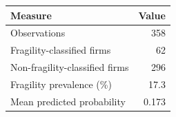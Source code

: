 \begin{tabular}{lr}
\toprule
Measure & Value \\
\midrule
Observations & 358 \\
Fragility-classified firms & 62 \\
Non-fragility-classified firms & 296 \\
Fragility prevalence (\%) & 17.3 \\
Mean predicted probability & 0.173 \\
\bottomrule
\end{tabular}
